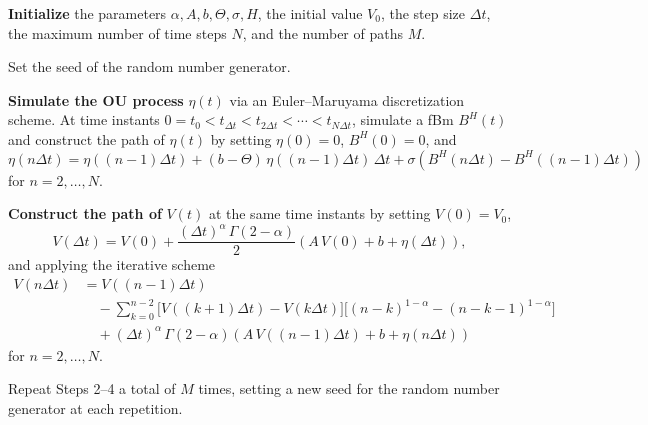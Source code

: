 \documentclass[11pt,reqno,oneside, a4paper]{amsart}
\numberwithin{equation}{section}
\theoremstyle{remark}
\begin{document}
\begin{algorithm}
\label{algorithm:1}
\caption{Simulation of the fractional neuronal model}
\begin{algorithmic}[1]
\item \textbf{Initialize} the parameters $\alpha, A, b, \Theta, \sigma, H$, 
    the initial value $V_0$, the step size $\Delta t$, the maximum number 
    of time steps $N$, and the number of paths $M$.

\item Set the seed of the random number generator.

\item  \textbf{Simulate the OU process} $\eta(t)$ via an Euler--Maruyama 
    discretization scheme. At time instants 
    $0 = t_0 < t_{\Delta t} < t_{2\Delta t} < \cdots < t_{N\Delta t}$, 
    simulate a fBm $B^H(t)$ and construct the path 
    of $\eta(t)$ by setting $\eta(0) = 0$, $B^H(0) = 0$, and
    \begin{equation*}
        \eta(n\Delta t) = \eta((n-1)\Delta t) 
        +(b- \Theta)\,\eta((n-1)\Delta t)\,\Delta t 
        + \sigma\!\left(B^H(n\Delta t) - B^H((n-1)\Delta t)\right)
    \end{equation*}
    for $n = 2, \ldots, N$.

\item \textbf{Construct the path of} $V(t)$ at the same time instants 
    by setting $V(0) = V_0$,
    \begin{equation*}
        V(\Delta t) = V(0) 
        + \frac{(\Delta t)^{\alpha}\,\Gamma(2-\alpha)}{2}
        \left(A\,V(0) + b + \eta(\Delta t)\right),
    \end{equation*}
    and applying the iterative scheme
    \begin{align*}
        V(n\Delta t) 
        &= V((n-1)\Delta t) \\
        &\quad - \sum_{k=0}^{n-2}\bigl[V((k+1)\Delta t) - V(k\Delta t)\bigr]
          \bigl[(n-k)^{1-\alpha} - (n-k-1)^{1-\alpha}\bigr] \\
        &\quad + (\Delta t)^{\alpha}\,\Gamma(2-\alpha)
          \left(A\,V((n-1)\Delta t) + b + \eta(n\Delta t)\right)
    \end{align*}
    for $n = 2, \ldots, N$.

\item Repeat Steps 2--4 a total of $M$ times, setting a new seed for the 
    random number generator at each repetition.
\end{algorithmic}
\end{algorithm}
\end{document}
